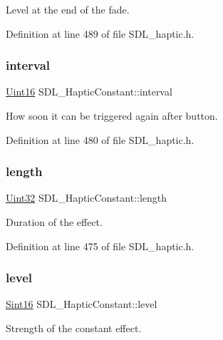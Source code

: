 Level at the end of the fade. 

Definition at line 489 of file S\+D\+L\+\_\+haptic.\+h.

\mbox{\label{struct_s_d_l___haptic_constant_ab1f7f0df856f4cf1fdf937cb886226b4}} 
\subsubsection{\texorpdfstring{interval}{interval}}
{\footnotesize\ttfamily \mbox{\hyperlink{_s_d_l__stdinc_8h_a31fcc0a076c9068668173ee26d33e42b}{Uint16}} S\+D\+L\+\_\+\+Haptic\+Constant\+::interval}

How soon it can be triggered again after button. 

Definition at line 480 of file S\+D\+L\+\_\+haptic.\+h.

\mbox{\label{struct_s_d_l___haptic_constant_aeb994c356b1d236b060f277d157e98ec}} 
\subsubsection{\texorpdfstring{length}{length}}
{\footnotesize\ttfamily \mbox{\hyperlink{_s_d_l__stdinc_8h_add440eff171ea5f55cb00c4a9ab8672d}{Uint32}} S\+D\+L\+\_\+\+Haptic\+Constant\+::length}

Duration of the effect. 

Definition at line 475 of file S\+D\+L\+\_\+haptic.\+h.

\mbox{\label{struct_s_d_l___haptic_constant_a5b095eea77464623ed57af15f29f4ca6}} 
\subsubsection{\texorpdfstring{level}{level}}
{\footnotesize\ttfamily \mbox{\hyperlink{_s_d_l__stdinc_8h_a9d0257032c0e146ab6121bf0122712f5}{Sint16}} S\+D\+L\+\_\+\+Haptic\+Constant\+::level}

Strength of the constant effect. 


